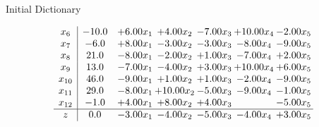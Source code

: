 \documentclass[8pt]{article}
\begin{document}
Initial Dictionary 

\[\begin{array}{c| c c@{\hskip 2pt} c@{\hskip 2pt} c@{\hskip 2pt} c@{\hskip 2pt} c@{\hskip 2pt} }
 x_{6}   &  -10.0 & +  6.00 x_{1} & +  4.00 x_{2} & -7.00 x_{3} & + 10.00 x_{4} & -2.00 x_{5}\\
 x_{7}   &  -6.0 & +  8.00 x_{1} & -3.00 x_{2} & -3.00 x_{3} & -8.00 x_{4} & -9.00 x_{5}\\
 x_{8}   &  21.0 & -8.00 x_{1} & -2.00 x_{2} & +  1.00 x_{3} & -7.00 x_{4} & +  2.00 x_{5}\\
 x_{9}   &  13.0 & -7.00 x_{1} & -4.00 x_{2} & +  3.00 x_{3} & + 10.00 x_{4} & +  6.00 x_{5}\\
 x_{10}   &  46.0 & -9.00 x_{1} & +  1.00 x_{2} & +  1.00 x_{3} & -2.00 x_{4} & -9.00 x_{5}\\
 x_{11}   &  29.0 & -8.00 x_{1} & + 10.00 x_{2} & -5.00 x_{3} & -9.00 x_{4} & -1.00 x_{5}\\
 x_{12}   &  -1.0 & +  4.00 x_{1} & +  8.00 x_{2} & +  4.00 x_{3} &   & -5.00 x_{5}\\
\hline
z    &  0.0 & -3.00 x_{1} & -4.00 x_{2} & -5.00 x_{3} & -4.00 x_{4} & +  3.00 x_{5}\\
\end{array}\]
\end{document}
